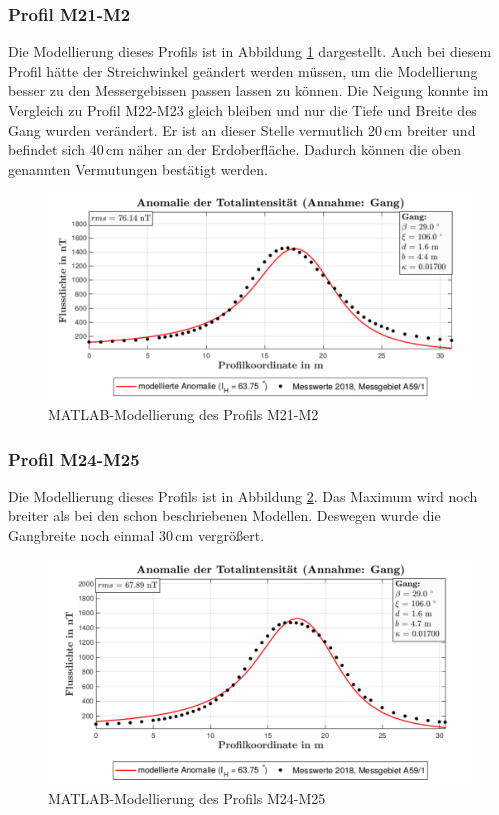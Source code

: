 \subsubsection{Profil M21-M2}

Die Modellierung dieses Profils ist in Abbildung \ref{fig:modM21} dargestellt. Auch bei diesem Profil hätte der Streichwinkel geändert werden müssen, um die Modellierung besser zu den Messergebissen passen lassen zu können. Die Neigung konnte im Vergleich zu Profil M22-M23 gleich bleiben und nur die Tiefe und Breite des Gang wurden verändert. Er ist an dieser Stelle vermutlich 20\,cm breiter und befindet sich 40\,cm näher an der Erdoberfläche. Dadurch können die oben genannten Vermutungen bestätigt werden.

\begin{figure}
 \centering
 \includegraphics[width=\textwidth]{fig/modM21}
 \caption{MATLAB-Modellierung des Profils M21-M2}
 \label{fig:modM21}
\end{figure}

\subsubsection{Profil M24-M25}

Die Modellierung dieses Profils ist in Abbildung \ref{fig:modM24}. Das Maximum wird noch breiter als bei den schon beschriebenen Modellen. Deswegen wurde die Gangbreite noch einmal 30\,cm vergrößert. 

\begin{figure}
 \centering
 \includegraphics[width=\textwidth]{fig/modM24}
 \caption{MATLAB-Modellierung des Profils M24-M25}
 \label{fig:modM24}
\end{figure}



